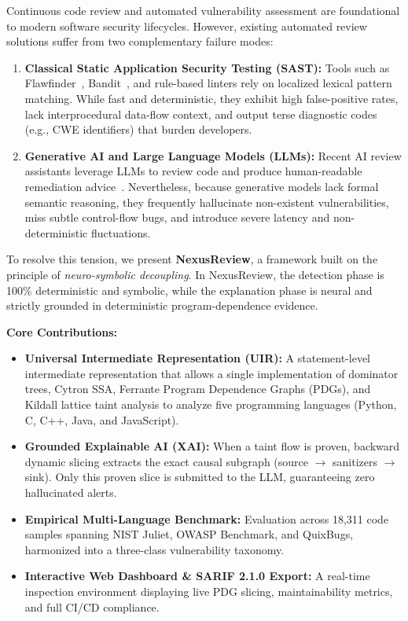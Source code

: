 \documentclass[10pt,conference]{IEEEtran}
\begin{document}
Continuous code review and automated vulnerability assessment are foundational to modern software security lifecycles. However, existing automated review solutions suffer from two complementary failure modes:

\begin{enumerate}
    \item \textbf{Classical Static Application Security Testing (SAST):} Tools such as Flawfinder~\cite{flawfinder}, Bandit~\cite{bandit}, and rule-based linters rely on localized lexical pattern matching. While fast and deterministic, they exhibit high false-positive rates, lack interprocedural data-flow context, and output terse diagnostic codes (e.g., CWE identifiers) that burden developers.
    \item \textbf{Generative AI and Large Language Models (LLMs):} Recent AI review assistants leverage LLMs to review code and produce human-readable remediation advice~\cite{deputydev}. Nevertheless, because generative models lack formal semantic reasoning, they frequently hallucinate non-existent vulnerabilities, miss subtle control-flow bugs, and introduce severe latency and non-deterministic fluctuations.
\end{enumerate}

To resolve this tension, we present \textbf{NexusReview}, a framework built on the principle of \emph{neuro-symbolic decoupling}. In NexusReview, the detection phase is 100\% deterministic and symbolic, while the explanation phase is neural and strictly grounded in deterministic program-dependence evidence.

\textbf{Core Contributions:}
\begin{itemize}
    \item \textbf{Universal Intermediate Representation (UIR):} A statement-level intermediate representation that allows a single implementation of dominator trees, Cytron SSA, Ferrante Program Dependence Graphs (PDGs), and Kildall lattice taint analysis to analyze five programming languages (Python, C, C++, Java, and JavaScript).
    \item \textbf{Grounded Explainable AI (XAI):} When a taint flow is proven, backward dynamic slicing extracts the exact causal subgraph (source $\to$ sanitizers $\to$ sink). Only this proven slice is submitted to the LLM, guaranteeing zero hallucinated alerts.
    \item \textbf{Empirical Multi-Language Benchmark:} Evaluation across 18{,}311 code samples spanning NIST Juliet, OWASP Benchmark, and QuixBugs, harmonized into a three-class vulnerability taxonomy.
    \item \textbf{Interactive Web Dashboard \& SARIF 2.1.0 Export:} A real-time inspection environment displaying live PDG slicing, maintainability metrics, and full CI/CD compliance.
\end{itemize}
\end{document}
